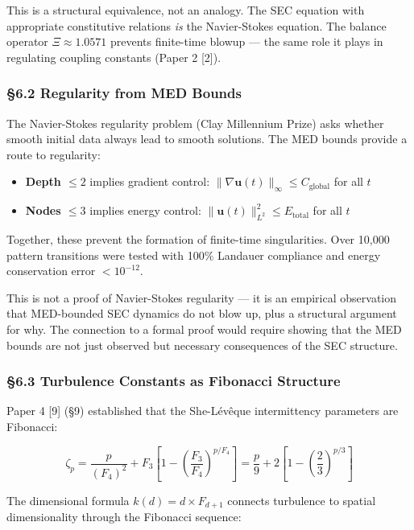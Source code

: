 \documentclass[
  11pt,
  a4paper]{article}
\providecommand{\tightlist}{%
  \setlength{\itemsep}{0pt}\setlength{\parskip}{0pt}}
\begin{document}
This is a structural equivalence, not an analogy. The SEC equation with
appropriate constitutive relations \emph{is} the Navier-Stokes equation.
The balance operator \(\Xi \approx 1.0571\) prevents finite-time blowup
--- the same role it plays in regulating coupling constants (Paper 2
{[}2{]}).

\subsubsection{§6.2 Regularity from MED
Bounds}\label{regularity-from-med-bounds}

The Navier-Stokes regularity problem (Clay Millennium Prize) asks
whether smooth initial data always lead to smooth solutions. The MED
bounds provide a route to regularity:

\begin{itemize}
\tightlist
\item
  \textbf{Depth \(\leq 2\)} implies gradient control:
  \(\|\nabla\mathbf{u}(t)\|_\infty \leq C_\text{global}\) for all \(t\)
\item
  \textbf{Nodes \(\leq 3\)} implies energy control:
  \(\|\mathbf{u}(t)\|^2_{L^2} \leq E_\text{total}\) for all \(t\)
\end{itemize}

Together, these prevent the formation of finite-time singularities. Over
10,000 pattern transitions were tested with 100\% Landauer compliance
and energy conservation error \(< 10^{-12}\).

This is not a proof of Navier-Stokes regularity --- it is an empirical
observation that MED-bounded SEC dynamics do not blow up, plus a
structural argument for why. The connection to a formal proof would
require showing that the MED bounds are not just observed but necessary
consequences of the SEC structure.

\subsubsection{§6.3 Turbulence Constants as Fibonacci
Structure}\label{turbulence-constants-as-fibonacci-structure}

Paper 4 {[}9{]} (§9) established that the She-Lévêque intermittency
parameters are Fibonacci:

\[\zeta_p = \frac{p}{(F_4)^2} + F_3\left[1 - \left(\frac{F_3}{F_4}\right)^{p/F_4}\right] = \frac{p}{9} + 2\left[1 - \left(\frac{2}{3}\right)^{p/3}\right]\]

The dimensional formula \(k(d) = d \times F_{d+1}\) connects turbulence
to spatial dimensionality through the Fibonacci sequence:
\end{document}
